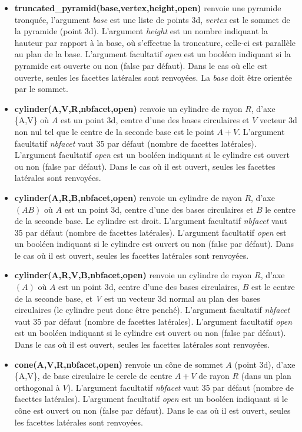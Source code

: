 \begin{itemize}
    \item \textbf{truncated\_pyramid(base,vertex,height,open)} renvoie une pyramide tronquée, l'argument \emph{base} est une liste de points 3d, \emph{vertex} est le sommet de la pyramide (point 3d). L'argument \emph{height} est un nombre indiquant la hauteur par rapport à la base, où s'effectue la troncature, celle-ci est parallèle au plan de la base. L'argument facultatif \emph{open} est un booléen indiquant si la pyramide est ouverte ou non (false par défaut). Dans le cas où elle est ouverte, seules les facettes latérales sont renvoyées. La \emph{base} doit être orientée par le sommet.
    
    \item \textbf{cylinder(A,V,R,nbfacet,open)} renvoie un cylindre de rayon $R$, d'axe \{A,V\} où $A$ est un point 3d, centre d'une des bases circulaires et $V$ vecteur 3d non nul tel que le centre de la seconde base est le point $A+V$. L'argument facultatif \emph{nbfacet} vaut 35 par défaut (nombre de facettes latérales). L'argument facultatif \emph{open} est un booléen indiquant si le cylindre est ouvert ou non (false par défaut). Dans le cas où il est ouvert, seules les facettes latérales sont renvoyées.
    
    \item \textbf{cylinder(A,R,B,nbfacet,open)} renvoie un cylindre de rayon $R$, d'axe $(AB)$ où $A$ est un point 3d, centre d'une des bases circulaires et $B$ le centre de la seconde base. Le cylindre est droit. L'argument facultatif \emph{nbfacet} vaut 35 par défaut (nombre de facettes latérales). L'argument facultatif \emph{open} est un booléen indiquant si le cylindre est ouvert ou non (false par défaut). Dans le cas où il est ouvert, seules les facettes latérales sont renvoyées.
    
   \item \textbf{cylinder(A,R,V,B,nbfacet,open)} renvoie un cylindre de rayon $R$, d'axe $(A)$ où $A$ est un point 3d, centre d'une des bases circulaires, $B$ est le centre de la seconde base, et \emph{V} est un vecteur 3d normal au plan des bases circulaires (le cylindre peut donc être penché). L'argument facultatif \emph{nbfacet} vaut 35 par défaut (nombre de facettes latérales). L'argument facultatif \emph{open} est un booléen indiquant si le cylindre est ouvert ou non (false par défaut). Dans le cas où il est ouvert, seules les facettes latérales sont renvoyées.
    
    \item \textbf{cone(A,V,R,nbfacet,open)} renvoie un cône de sommet $A$ (point 3d), d'axe \{A,V\}, de base circulaire le cercle de centre $A+V$ de rayon $R$ (dans un plan orthogonal à $V$). L'argument facultatif \emph{nbfacet} vaut 35 par défaut (nombre de facettes latérales). L'argument facultatif \emph{open} est un booléen indiquant si le cône est ouvert ou non (false par défaut). Dans le cas où il est ouvert, seules les facettes latérales sont renvoyées.


\end{itemize}
